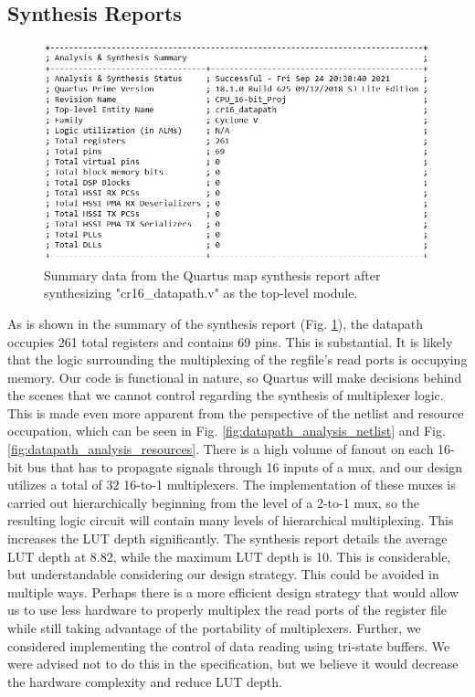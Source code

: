 \documentclass[conference]{IEEEtran}
\begin{document}
\subsection{Synthesis Reports}
\begin{figure}[h]
    \centering
    \includegraphics[scale=0.5]{lab_2_figures/analysis_and_synthesis_summary.JPG}
    \caption{Summary data from the Quartus map synthesis report after synthesizing "cr16\_datapath.v" as the top-level module.}
    \label{fig:datapath_analysis_summary}
\end{figure}

As is shown in the summary of the synthesis report (Fig. \ref{fig:datapath_analysis_summary}), the datapath occupies 261 total registers and contains 69 pins. This is substantial. It is likely that the logic surrounding the multiplexing of the regfile's read ports is occupying memory. Our code is functional in nature, so Quartus will make decisions behind the scenes that we cannot control regarding the synthesis of multiplexer logic. This is made even more apparent from the perspective of the netlist and resource occupation, which can be seen in Fig. \ref{fig:datapath_analysis_netlist} and Fig. \ref{fig:datapath_analysis_resources}. There is a high volume of fanout on each 16-bit bus that has to propagate signals through 16 inputs of a mux, and our design utilizes a total of 32 16-to-1 multiplexers. The implementation of these muxes is carried out hierarchically beginning from the level of a 2-to-1 mux, so the resulting logic circuit will contain many levels of hierarchical multiplexing. This increases the LUT depth significantly. The synthesis report details the average LUT depth at 8.82, while the maximum LUT depth is 10. This is considerable, but understandable considering our design strategy. This could be avoided in multiple ways. Perhaps there is a more efficient design strategy that would allow us to use less hardware to properly multiplex the read ports of the register file while still taking advantage of the portability of multiplexers. Further, we considered implementing the control of data reading using tri-state buffers. We were advised not to do this in the specification, but we believe it would decrease the hardware complexity and reduce LUT depth.
\end{document}
